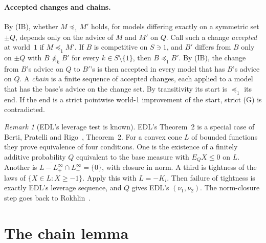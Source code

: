 \documentclass[11pt]{article}
\theoremstyle{definition}\newtheorem{definition}[theorem]{Definition}
\theoremstyle{remark}\newtheorem{remark}[theorem]{Remark}
\begin{document}
\paragraph{Accepted changes and chains.} By (IB), whether $M\preceq_1M'$
holds, for models differing exactly on a symmetric set $\pm Q$, depends only
on the advice of $M$ and $M'$ on $Q$. Call such a change \emph{accepted} at
world~$1$ if $M\preceq_1M'$. If $B$ is competitive on $S\ni1$, and $B'$
differs from $B$ only on $\pm Q$ with $B\not\preceq_kB'$ for every
$k\in S\setminus\{1\}$, then $B\preceq_1B'$. By (IB), the change from $B$'s
advice on $Q$ to $B'$'s is then accepted in every model that has $B$'s advice
on $Q$. A \emph{chain} is a finite sequence of accepted changes, each applied
to a model that has the base's advice on the change set. By transitivity its
start is $\preceq_1$ its end. If the end is a strict pointwise world-1
improvement of the start, strict (G) is contradicted.

\begin{remark}[EDL's leverage test is known]\label{rem:BPR}
EDL's Theorem~2 is a special case of Berti, Pratelli and Rigo~\cite{BPR},
Theorem~2. For a convex cone $L$ of bounded functions they prove equivalence
of four conditions. One is the existence of a finitely additive probability
$Q$ equivalent to the base measure with $E_QX\le0$ on $L$. Another is
$\overline{L-L^\infty_+}\cap L^\infty_+=\{0\}$, with closure in norm. A third
is tightness of the laws of $\{X\in L:X\ge-1\}$. Apply this with $L=-K_i$.
Then failure of tightness is exactly EDL's leverage sequence, and $Q$ gives
EDL's $(\nu_1,\nu_2)$. The norm-closure step goes back to Rokhlin~\cite{Rokhlin}.
\end{remark}

\section{The chain lemma}\label{sec:chain}
\end{document}
